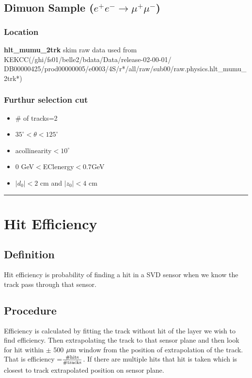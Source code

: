 \documentclass[12pt]{article}
\begin{document}
     \subsection{ Dimuon Sample ($e^+ e^-\rightarrow \mu^+ \mu^-$)}
     \subsubsection{Location}  \textbf{hlt\_mumu\_2trk} skim raw data used from KEKCC(/ghi/fs01/belle2/bdata/Data/release-02-00-01/\\DB00000425/prod00000005/e0003/4S/r*/all/raw/sub00/raw.physics.hlt\_mumu\_2trk*) 
     \subsubsection{Furthur selection cut}
     \begin{itemize}
     	\item \# of tracks=2
     	\item $35^{\circ}<\theta<125^{\circ}$
     	\item acollinearity$<10^{\circ}$
     	\item 0 GeV$<$EClenergy$<0.7$GeV
     	\item $|d_0|<2$ cm and $|z_0|<4$ cm		
     \end{itemize}
     \rule{\textwidth}{0.4pt}
     \pagebreak	
     
	\section{Hit Efficiency}
	\subsection{Definition}
	 Hit efficiency is probability of finding a hit in a SVD sensor  when we know the track pass through that sensor.
	 \subsection{Procedure} Efficiency is calculated  by fitting the track without hit of the layer we wish to find efficiency. Then  extrapolating the track to that sensor plane and 
	 then look for hit within $\pm$ 500 $\mu\rm{m}$ window from the position of extrapolation of the track. That is efficiency =$\frac{\rm{\# hits}}{\rm{\#tracks}}$. If there are multiple hits that hit is taken which is closest to track extrapolated position on sensor plane.
\end{document}
